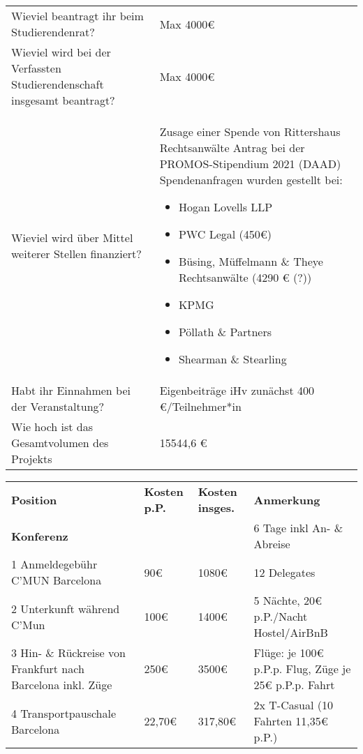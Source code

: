 {\begin{tabularx}{\textwidth}{X X}
        Wieviel beantragt ihr beim Studierendenrat?                             & Max 4000€       \\
        Wieviel wird bei der Verfassten Studierendenschaft insgesamt beantragt? & Max 4000€    \\
        Wieviel wird über Mittel weiterer Stellen finanziert?                   & 
        Zusage einer Spende von Rittershaus Rechtsanwälte \newline
        Antrag bei der PROMOS-Stipendium 2021 (DAAD)\newline
        Spendenanfragen wurden gestellt bei:
        \begin{itemize}
            \item Hogan Lovells LLP
            \item PWC Legal (450€)
            \item Büsing, Müffelmann \& Theye Rechtsanwälte (4290 € (?))
            \item KPMG
            \item Pöllath \& Partners
            \item Shearman \& Stearling
        \end{itemize}\\
        Habt ihr Einnahmen bei der Veranstaltung?                               & Eigenbeiträge iHv zunächst 400 €/Teilnehmer*in\\
        Wie hoch ist das Gesamtvolumen des Projekts                             & 15544,6 €\\
    \end{tabularx}
    \newline
    \vspace*{2em}
    \newline
    \begin{tabular}{p{4cm} p{1cm} p{1cm} p{9cm}}
        \textbf{Position} & \textbf{Kosten p.P.} & \textbf{Kosten insges.} & \textbf{Anmerkung} \\
        \textbf{Konferenz} & & & 6 Tage inkl An- \& Abreise\\
        1 Anmeldegebühr C'MUN Barcelona & 90€ & 1080€ & 12 Delegates\\
        2 Unterkunft während C'Mun & 100€ & 1400€ & 5 Nächte, 20€ p.P./Nacht Hostel/AirBnB\\
        3 Hin- \& Rückreise von Frankfurt nach Barcelona inkl. Züge & 250€ & 3500€ & Flüge: je 100€ p.P.p. Flug, Züge je 25€ p.P.p. Fahrt\\
        4 Transportpauschale Barcelona & 22,70€ & 317,80€ & 2x T-Casual (10 Fahrten 11,35€ p.P.)\\

\end{tabular}}
